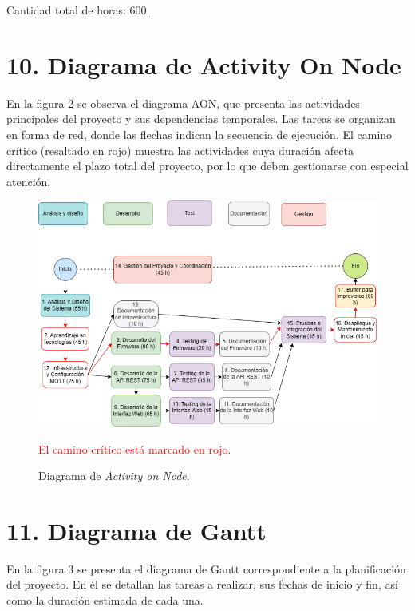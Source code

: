 \documentclass[
11pt, %
]{charter}
\begin{document}
Cantidad total de horas: 600. 

\newpage

\section{10. Diagrama de Activity On Node}
\label{sec:AoN}
En la figura 2 se observa el diagrama AON, que presenta las actividades principales del proyecto y sus dependencias temporales. Las tareas se organizan en forma de red, donde las flechas indican la secuencia de ejecución. El camino crítico (resaltado en rojo) muestra las actividades cuya duración afecta directamente el plazo total del proyecto, por lo que deben gestionarse con especial atención.
\vspace{2cm}
\begin{figure}[htpb]
\centering 
\includegraphics[width=1.1\textwidth]{./Figuras/AoN.png}
\caption{Diagrama de \textit{Activity on Node}.}
\label{fig:AoN}
   
\vspace{0.5em}
{\small \textcolor{red}{El camino crítico está marcado en rojo.}}
\end{figure}

\newpage

\section{11. Diagrama de Gantt}
\label{sec:gantt}
En la figura 3 se presenta el diagrama de Gantt correspondiente a la planificación del proyecto. En él se detallan las tareas a realizar, sus fechas de inicio y fin, así como la duración estimada de cada una. 
\end{document}

